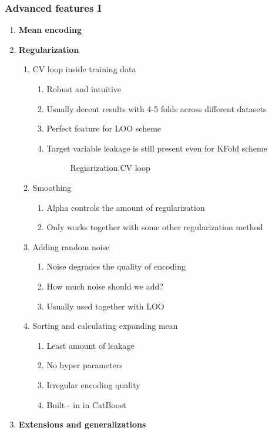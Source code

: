 \documentclass[11pt, twoside]{article}   	%
\begin{document}
 
\subsubsection{Advanced features I}
 \begin{enumerate}
\item \textbf{Mean encoding} 
\item \textbf{Regularization}
      \begin{enumerate}
      \item CV loop inside training data
       \begin{enumerate}
          \item Robust and intuitive
          \item Usually decent results with 4-5 folds across different datasets
          \item Perfect feature for LOO scheme
          \item Target variable leakage is still present even for KFold scheme
                    \begin{figure}
    [!htb]\centering
    \caption{Regiarization.CV loop}
  \label{fig:phase}
  \end{figure}
          \end{enumerate}
      \item Smoothing
       \begin{enumerate}
          \item Alpha controls the amount of regularization
          \item Only works together with some other regularization method
        \end{enumerate}          
      \item Adding random noise
       \begin{enumerate}
          \item Noise degrades the quality of encoding
          \item How much noise should we add?
          \item  Usually used together with LOO
        \end{enumerate}          
      \item Sorting and calculating expanding mean        
       \begin{enumerate}
          \item Least amount of leakage
          \item No hyper parameters
          \item Irregular encoding quality
          \item Built - in in CatBoost 
        \end{enumerate}   
     \end{enumerate}
\item \textbf{Extensions and generalizations}

 \end{enumerate}
\end{document}
